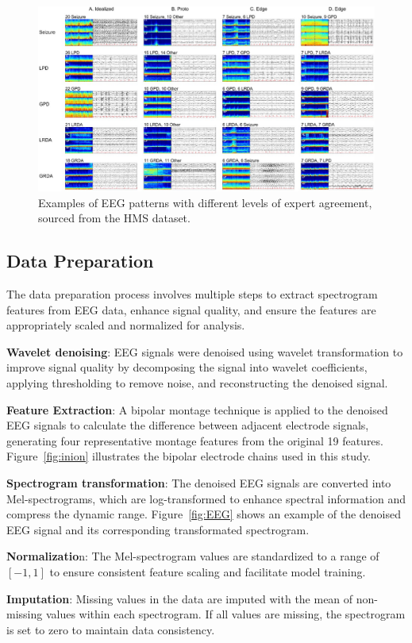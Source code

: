 \documentclass[conference]{IEEEtran}
\let\proglang=\textsf
\let\pkg=\texttt
\begin{document}
\begin{figure}[tbp]
\centering
\includegraphics[width=.48\textwidth]{example}
\caption{Examples of EEG patterns with different levels of expert agreement,
sourced from the HMS dataset.}
\label{fig:ex}
\end{figure}


\subsection{Data Preparation}


The data preparation process involves multiple steps to extract spectrogram
features from EEG data, enhance signal quality, and ensure the features are
appropriately scaled and normalized for analysis.


\textbf{Wavelet denoising}: EEG signals were denoised using wavelet
transformation to improve signal quality by decomposing the signal into wavelet
coefficients, applying thresholding to remove noise, and reconstructing the
denoised signal.


\textbf{Feature Extraction}: A bipolar montage technique is applied to the
denoised EEG signals to calculate the difference between adjacent electrode
signals, generating four representative montage features from the original 19
features. Figure~\ref{fig:inion} illustrates the bipolar electrode chains used
in this study.


\textbf{Spectrogram transformation}: The denoised EEG signals are converted
into Mel-spectrograms, which are log-transformed to enhance spectral
information and compress the dynamic range. Figure~\ref{fig:EEG} shows an
example of the denoised EEG signal and its corresponding transformated
spectrogram.


\textbf{Normalizatio}n: The Mel-spectrogram values are standardized to a range
of $[-1,1]$ to ensure consistent feature scaling and facilitate model training.


\textbf{Imputation}: Missing values in the data are imputed with the mean of
non-missing values within each spectrogram. If all values are missing,
the spectrogram is set to zero to maintain data consistency.
\end{document}

